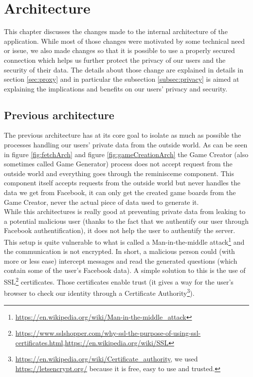 \chapter{Architecture}
This chapter discusses the changes made to the internal architecture of the application. While most of those changes were motivated by some technical need or issue, we also made changes so that it is possible to use a properly secured connection which helps us further protect the privacy of our users and the security of their data. The details about those change are explained in details in section \ref{sec:proxy} and in particular the subsection \ref{subsec:privacy} is aimed at explaining the implications and benefits on our users' privacy and security.
\section{Previous architecture}
The previous architecture has at its core goal to isolate as much as possible the processes handling our users' private data from the outside world. As can be seen in figure \ref{fig:fetchArch} and figure \ref{fig:gameCreationArch} the Game Creator (also sometimes called Game Generator) process does not accept request from the outside world and everything goes through the reminisceme component. This component itself accepts requests from the outside world but never handles the data we get from Facebook, it can only get the created game boards from the Game Creator, never the actual piece of data used to generate it.\\
While this architectures is really good at preventing private data from leaking to a potential malicious user (thanks to the fact that we authentify our user through Facebook authentification), it does not help the user to authentify the server. This setup is quite vulnerable to what is called a Man-in-the-middle attack\footnote{\url{https://en.wikipedia.org/wiki/Man-in-the-middle_attack}} and the communication is not encrypted. In short, a malicious person could (with more or less ease) intercept messages and read the generated questions (which contain some of the user's Facebook data). A simple solution to this is the use of SSL\footnote{\url{https://www.sslshopper.com/why-ssl-the-purpose-of-using-ssl-certificates.html},\url{https://en.wikipedia.org/wiki/SSL}} certificates. Those certificates enable trust (it gives a way for the user's browser to check our identity through a Certificate Authority\footnote{\url{https://en.wikipedia.org/wiki/Certificate_authority}, we used \url{https://letsencrypt.org/} because it is free, easy to use and trusted.}).
